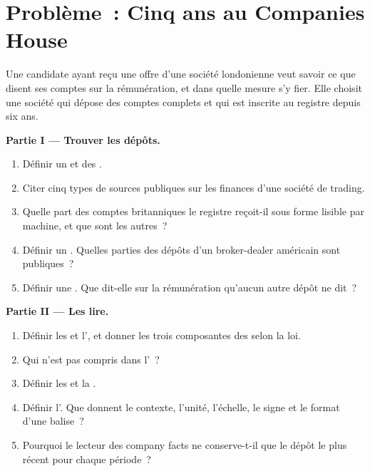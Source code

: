 \section{Problème~: Cinq ans au Companies House}

\begin{problem}\label{pb:in:reading-a-trading-firms-accounts:1}
Une candidate ayant reçu une offre d'une société londonienne veut savoir ce que disent ses comptes sur la rémunération, et dans quelle mesure s'y fier.
Elle choisit une société qui dépose des comptes complets et qui est inscrite au registre depuis six ans.

\medskip\noindent\textbf{Partie I --- Trouver les dépôts.}
\begin{enumerate}
\item Définir un  et des .
\item Citer cinq types de sources publiques sur les finances d'une société de trading.
\item Quelle part des comptes britanniques le registre reçoit-il sous forme lisible par machine, et que sont les autres~?
\item Définir un . Quelles parties des dépôts d'un broker-dealer américain sont publiques~?
\item Définir une . Que dit-elle sur la rémunération qu'aucun autre dépôt ne dit~?
\end{enumerate}

\medskip\noindent\textbf{Partie II --- Les lire.}
\begin{enumerate}[resume]
\item Définir les  et l', et donner les trois composantes des  selon la loi.
\item Qui n'est pas compris dans l'~?
\item Définir les  et la .
\item Définir l'. Que donnent le contexte, l'unité, l'échelle, le signe et le format d'une balise~?
\item Pourquoi le lecteur des company facts ne conserve-t-il que le dépôt le plus récent pour chaque période~?
\end{enumerate}


\end{problem}
